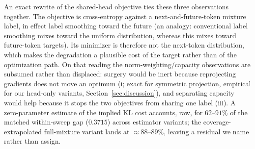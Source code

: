 An exact rewrite of the shared-head objective ties these three observations
together. The objective is cross-entropy against a next-and-future-token mixture label, in effect label smoothing toward the future (an analogy: conventional label smoothing mixes toward the uniform distribution, whereas this mixes toward future-token targets). Its minimizer is therefore not the next-token distribution, which makes the degradation a plausible cost of the target rather than of the optimization path. On that reading
the norm-weighting/capacity observations are subsumed rather than displaced: surgery
would be inert because reprojecting gradients does not move an optimum (i; exact for symmetric projection, empirical for our head-only variants, Section~\ref{sec:discussion}), and
separating capacity would help because it stops the two objectives from sharing one
label (iii). A zero-parameter estimate of the implied KL cost accounts, raw,
for $62$--$91\%$ of the matched within-sweep gap ($0.3715$) across estimator
variants; the coverage-extrapolated full-mixture variant lands at ${\approx}88$--$89\%$, leaving a residual we name
rather than assign.

